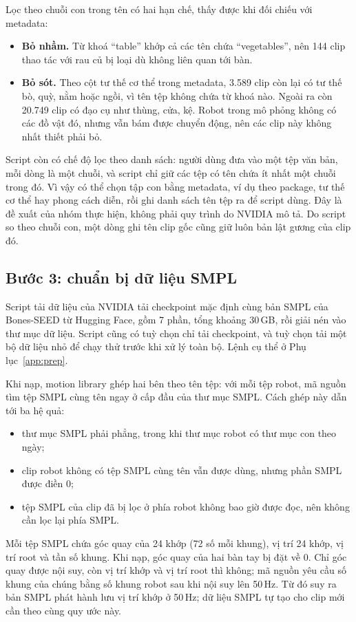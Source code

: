 \documentclass[12pt,a4paper,oneside]{report}
\begin{document}
Lọc theo chuỗi con trong tên có hai hạn chế, thấy được khi đối chiếu với metadata:
\begin{itemize}
\item \textbf{Bỏ nhầm.} Từ khoá ``table'' khớp cả các tên chứa ``vegetables'', nên 144 clip thao tác với rau củ bị loại dù không liên quan tới bàn.
\item \textbf{Bỏ sót.} Theo cột tư thế cơ thể trong metadata, 3.589 clip còn lại có tư thế bò, quỳ, nằm hoặc ngồi, vì tên tệp không chứa từ khoá nào. Ngoài ra còn 20.749 clip có đạo cụ như thùng, cửa, kệ. Robot trong mô phỏng không có các đồ vật đó, nhưng vẫn bám được chuyển động, nên các clip này không nhất thiết phải bỏ.
\end{itemize}
Script còn có chế độ lọc theo danh sách: người dùng đưa vào một tệp văn bản, mỗi dòng là một chuỗi, và script chỉ giữ các tệp có tên chứa ít nhất một chuỗi trong đó. Vì vậy có thể chọn tập con bằng metadata, ví dụ theo package, tư thế cơ thể hay phong cách diễn, rồi ghi danh sách tên tệp ra để script dùng. Đây là đề xuất của nhóm thực hiện, không phải quy trình do NVIDIA mô tả. Do script so theo chuỗi con, một dòng ghi tên clip gốc cũng giữ luôn bản lật gương của clip đó.

\subsection{Bước 3: chuẩn bị dữ liệu SMPL}

Script tải dữ liệu của NVIDIA tải checkpoint mặc định cùng bản SMPL của Bones-SEED từ Hugging Face, gồm 7 phần, tổng khoảng 30\,GB, rồi giải nén vào thư mục dữ liệu. Script cũng có tuỳ chọn chỉ tải checkpoint, và tuỳ chọn tải một bộ dữ liệu nhỏ để chạy thử trước khi xử lý toàn bộ. Lệnh cụ thể ở Phụ lục~\ref{app:prep}.

Khi nạp, motion library ghép hai bên theo tên tệp: với mỗi tệp robot, mã nguồn tìm tệp SMPL cùng tên ngay ở cấp đầu của thư mục SMPL. Cách ghép này dẫn tới ba hệ quả:
\begin{itemize}
\item thư mục SMPL phải phẳng, trong khi thư mục robot có thư mục con theo ngày;
\item clip robot không có tệp SMPL cùng tên vẫn được dùng, nhưng phần SMPL được điền 0;
\item tệp SMPL của clip đã bị lọc ở phía robot không bao giờ được đọc, nên không cần lọc lại phía SMPL.
\end{itemize}
Mỗi tệp SMPL chứa góc quay của 24 khớp (72 số mỗi khung), vị trí 24 khớp, vị trí root và tần số khung. Khi nạp, góc quay của hai bàn tay bị đặt về 0. Chỉ góc quay được nội suy, còn vị trí khớp và vị trí root thì không; mã nguồn yêu cầu số khung của chúng bằng số khung robot sau khi nội suy lên 50\,Hz. Từ đó suy ra bản SMPL phát hành lưu vị trí khớp ở 50\,Hz; dữ liệu SMPL tự tạo cho clip mới cần theo cùng quy ước này.
\end{document}
